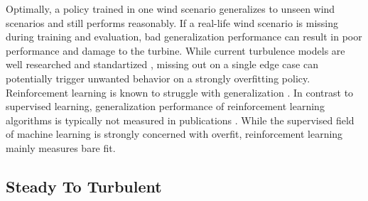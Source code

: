 Optimally, a policy trained in one wind scenario generalizes to unseen wind scenarios and still performs reasonably. If a real-life wind scenario is missing during training and evaluation, bad generalization performance can result in poor performance and damage to the turbine. While current turbulence models are well researched and standartized \cite{internationalelectrotechnicalcommissionIEC61400120192019}, missing out on a single edge case can potentially trigger unwanted behavior on a strongly overfitting policy. Reinforcement learning is known to struggle with generalization \cite{cobbeQuantifyingGeneralizationReinforcement2019}. In contrast to supervised learning, generalization performance of reinforcement learning algorithms is typically not measured in publications \cite{mnihPlayingAtariDeep2013,haarnojaSoftActorCriticOffPolicy2018,fujimotoAddressingFunctionApproximation2018}. While the supervised field of machine learning is strongly concerned with overfit, reinforcement learning mainly measures bare fit.

\subsection{Steady To Turbulent}

